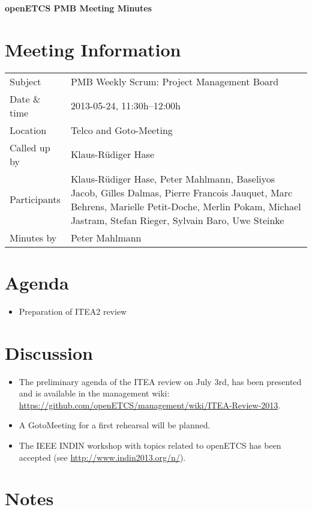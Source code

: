 \documentclass[a4paper, 11pt]{article}
\begin{document}
{\begin{center}\huge\bf openETCS PMB Meeting Minutes\end{center}}
\section{Meeting Information}

\renewcommand{\arraystretch}{1.5}
\begin{supertabular}{m{.2\textwidth}m{.8\textwidth}}
Subject & PMB Weekly Scrum: Project Management Board\\
Date \& time & 2013-05-24, 11:30h--12:00h\\
Location & Telco and Goto-Meeting\\
Called up by & Klaus-R\"udiger Hase\\
Participants &
Klaus-R\"udiger Hase,
Peter Mahlmann,
Baseliyos Jacob,
Gilles Dalmas,
Pierre Francois Jauquet,
Marc Behrens,
Marielle Petit-Doche,
Merlin Pokam,
Michael Jastram,
Stefan Rieger,
Sylvain Baro,
Uwe Steinke\\

Minutes by & Peter Mahlmann\\

\end{supertabular}
\renewcommand{\arraystretch}{1.0}


\section{{Agenda}}
\begin{itemize}
\item Preparation of ITEA2 review
\end{itemize}

\section{Discussion}
\begin{itemize}
\item The preliminary agenda of the ITEA review on July 3rd, has been presented and is available in the management wiki: \url{https://github.com/openETCS/management/wiki/ITEA-Review-2013}.
\item A GotoMeeting for a first rehearsal will be planned.
\item The IEEE INDIN workshop with topics related to openETCS has been accepted (see \url{http://www.indin2013.org/n/}).
\end{itemize}

\section{Notes}
\end{document}
